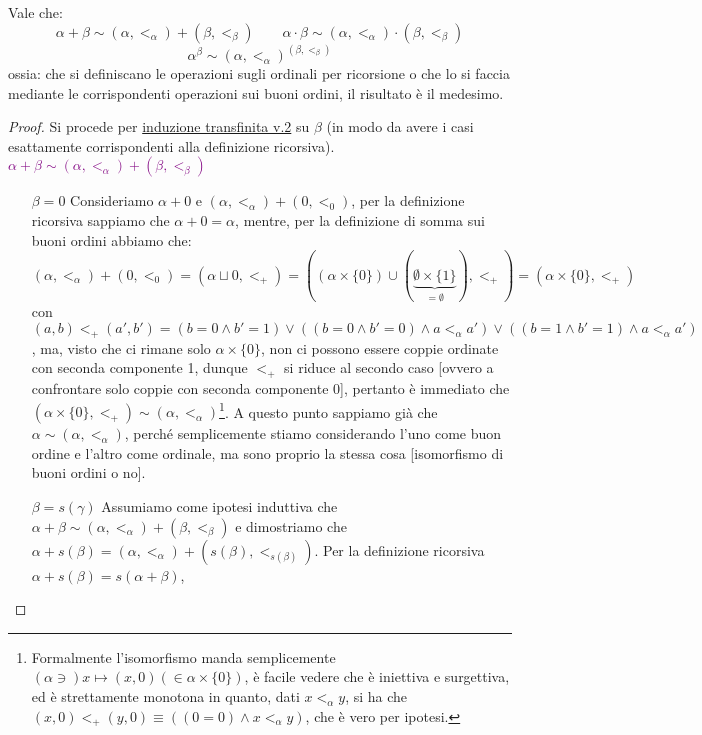 \documentclass[11pt]{scrartcl}
\begin{document}
\begin{proposition}
	Vale che:
	\[ \alpha + \beta \sim (\alpha,<_\alpha) + (\beta,<_\beta) \qquad \alpha \cdot \beta \sim (\alpha,<_\alpha) \cdot (\beta,<_\beta) 
		\]\[ \alpha^\beta \sim (\alpha,<_\alpha)^{(\beta,<_\beta) }
			\]
	ossia: che si definiscano le operazioni sugli ordinali per ricorsione o che lo si faccia mediante le corrispondenti operazioni sui buoni ordini, il risultato è il medesimo.
\end{proposition}

\begin{proof}
	Si procede per \hyperref[induz_transf2]{induzione transfinita v.2} su $\beta$ (in modo da avere i casi esattamente corrispondenti alla definizione ricorsiva).\\
	\textcolor{purple}{$\alpha + \beta \sim (\alpha,<_\alpha) + (\beta,<_\beta)$}
	\begin{itemize}
		\item[$\boxed{\beta = 0}$] Consideriamo $\alpha + 0$ e $(\alpha,<_\alpha) + (0,<_0)$, per la definizione ricorsiva sappiamo che $\alpha + 0 = \alpha$, mentre, per la definizione di somma sui buoni ordini abbiamo che:
		\[ (\alpha,<_\alpha) + (0,<_0) = (\alpha \sqcup 0, <_+) = ((\alpha \times \{0\}) \cup (\underbrace{\emptyset \times \{1\}}_{= \emptyset}),<_+) = (\alpha \times \{0\},<_+)
			\]
		con $(a,b) <_+ (a',b') = (b = 0 \land b' = 1) \lor ((b = 0 \land b' = 0) \land a <_\alpha a') \lor ((b = 1 \land b' = 1) \land a <_\alpha a')$, ma, visto che ci rimane solo $\alpha \times \{0\}$, non ci possono essere coppie ordinate con seconda componente 1, dunque $<_+$ si riduce al secondo caso [ovvero a confrontare solo coppie con seconda componente $0$],
		pertanto è immediato che $(\alpha \times \{0\},<_+) \sim (\alpha,<_\alpha)$\footnote{Formalmente l'isomorfismo manda semplicemente $(\alpha \ni) x \mapsto (x,0) (\in \alpha \times \{0\})$, è facile vedere che è iniettiva e surgettiva, ed è strettamente monotona in quanto, dati $x <_\alpha y$, si ha che $(x,0) <_+ (y,0) \equiv ((0 = 0) \land x <_\alpha y)$, che è vero per ipotesi.}.
		A questo punto sappiamo già che $\alpha \sim (\alpha,<_\alpha)$, perché semplicemente stiamo considerando l'uno come buon ordine e l'altro come ordinale, ma sono proprio la stessa cosa [isomorfismo di buoni ordini o no].
		\item[$\boxed{\beta = s(\gamma)}$] Assumiamo come ipotesi induttiva che $\alpha + \beta \sim (\alpha,<_\alpha) + (\beta,<_\beta)$ e dimostriamo che $\alpha + s(\beta) = (\alpha,<_\alpha) + (s(\beta),<_{s(\beta)})$. Per la definizione ricorsiva $\alpha + s(\beta) = s(\alpha + \beta)$,

\end{itemize}
\end{proof}
\end{document}
